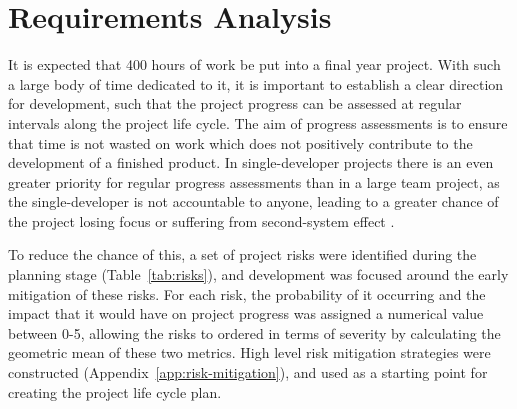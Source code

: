 \chapter{Requirements Analysis}\label{chap:requirements}

It is expected that 400 hours of work be put into a final year
project. With such a large body of time dedicated to it, it is
important to establish a clear direction for development, such that
the project progress can be assessed at regular intervals along the
project life cycle. The aim of progress assessments is to ensure that
time is not wasted on work which does not positively contribute to the
development of a finished product. In single-developer projects there
is an even greater priority for regular progress assessments than in a
large team project, as the single-developer is not accountable to
anyone, leading to a greater chance of the project losing focus or
suffering from second-system effect \cite{brooks1995mythical}.

To reduce the chance of this, a set of project risks were identified
during the planning stage (Table~\ref{tab:risks}), and development was
focused around the early mitigation of these risks. For each risk, the
probability of it occurring and the impact that it would have on
project progress was assigned a numerical value between 0-5, allowing
the risks to ordered in terms of severity by calculating the geometric
mean of these two metrics. High level risk mitigation strategies were
constructed (Appendix~\ref{app:risk-mitigation}), and used as a
starting point for creating the project life cycle plan.


